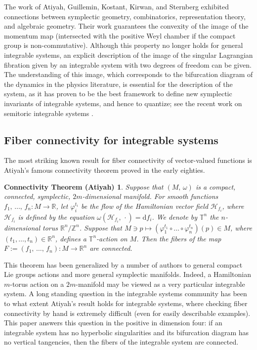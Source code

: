 \documentclass[11pt]{article}
\newtheorem*{notheorem}{Connectivity Theorem (Atiyah)}
\newcommand{\R}{{\mathbb R}}
\newcommand{\Z}{{\mathbb Z}}
\newcommand{\T}{{\mathbb T}}
\newcommand{\DD}{\mathrm{d}}
\newcommand{\RM}{\mathbb{R}}
\begin{document}
The work of Atiyah, Guillemin, Kostant, Kirwan, and Sternberg
exhibited connections between symplectic geometry, combinatorics,
representation theory, and algebraic geometry.  Their work guarantees
the convexity of the image of the momentum map (intersected with the
positive Weyl chamber if the compact group is
non-commutative). Although this property no longer holds for general
integrable systems, an explicit description of the image of the
singular Lagrangian fibration given by an integrable system with two
degrees of freedom can be given. The understanding of this image,
which corresponds to the bifurcation diagram of the dynamics in the
physics literature, is essential for the description of the system, as
it has proven to be the best framework to define new symplectic
invariants of integrable systems, and hence to quantize; see the
recent work on semitoric integrable systems 
\cite{PeVN2009,  PeVN2010, PeVN2011, PeVNpress}.
  
  
  
\subsection*{Fiber connectivity for integrable systems}


The most striking known result for fiber connectivity of vector-valued
functions is Atiyah's famous connectivity theorem \cite{At1982} proved
in the early eighties. 

\begin{notheorem} 
  Suppose that $(M,\, \omega)$ is a compact, connected, symplectic,
  $2m$-dimensional manifold.  For smooth functions $f_1,\, \ldots,\,
  f_n\colon M \to \mathbb{R}$, let $\varphi_i^{t_i}$ be the flow of
  the Hamiltonian vector field $\mathcal{H}_{f_i}$, where
  $\mathcal{H}_{f_i}$ is defined by the equation
  $\omega(\mathcal{H}_{f_i},\, \cdot)=\DD f_i$.  We denote by $\T^n$ the
  $n$-dimensional torus $\R^n/\Z^n$. 
  Suppose that $M\ni p
  \mapsto (\varphi_1^{t_1} \circ \ldots \circ \varphi_n^{t_n})(p) \in
  M $, where $(t_1, \ldots, t_n) \in \RM^n$, defines a $\T^n$-action
  on $M$.  Then the fibers of the map $F:=(f_1,\,\ldots,\, f_n) \colon
  M \to \mathbb{R}^n$ are connected.
\end{notheorem}

This theorem has been generalized by a number of authors to general
compact Lie groups actions and more general symplectic
manifolds. Indeed, a Hamiltonian $m$-torus action on a $2m$-manifold
may be viewed as a very particular integrable system. A long standing
question in the integrable systems community has been to what extent
Atiyah's result holds for integrable systems, where checking fiber
connectivity by hand is extremely difficult (even for easily
describable examples). This paper answers this question in the
positive in dimension four: if an integrable system has no hyperbolic
singularities and its bifurcation diagram has no vertical tangencies,
then the fibers of the integrable system are connected.
\end{document}
